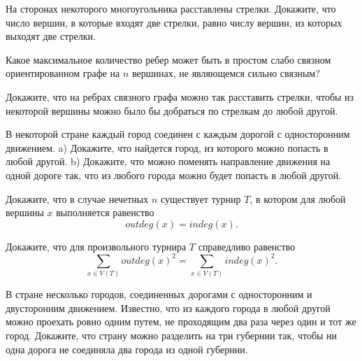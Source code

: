 \begin{exersize}
	На сторонах некоторого многоугольника расставлены стрелки. 
	Докажите, что число вершин, в которые входят 
	две стрелки, равно числу вершин, из которых выходят две стрелки.
\end{exersize}

\begin{exersize}
	Какое максимальное количество ребер может быть в простом
	слабо связном ориентированном графе на $n$ вершинах, 
	не являющемся сильно связным?
\end{exersize}

\begin{exersize}
	Докажите, что на ребрах связного графа можно так расставить стрелки, чтобы из некоторой вершины можно 
	было бы добраться по стрелкам до любой другой.
\end{exersize}

\begin{exersize}
	 В некоторой стране каждый город соединен с каждым дорогой с односторонним движением. 
	 a) Докажите, что найдется город, из которого можно попасть в любой другой. 
	 b) Докажите, что можно поменять направление движения на одной дороге так, что из любого города можно будет попасть в любой другой.
\end{exersize}

\begin{exersize}
	Докажите, что в случае нечетных $n$ существует турнир $T$, в котором для любой вершины $x$ выполняется равенство
	$$outdeg(x) = indeg(x).$$
\end{exersize}

\begin{exersize}
	Докажите, что для произвольного турнира $T$ справедливо равенство
	$$\sum_{x \in V(T)} outdeg(x)^2 = \sum_{x \in V(T)} indeg(x)^2.$$
\end{exersize}


\begin{exersize}
	В стране несколько городов, соединенных дорогами с односторонним и двусторонним движением. 
	Известно, что из каждого города в любой другой можно проехать ровно одним путем, не проходящим 
	два раза через один и тот же город. Докажите, что страну можно разделить на три губернии так, 
	чтобы ни одна дорога не соединяла два города из одной губернии.
\end{exersize}	

